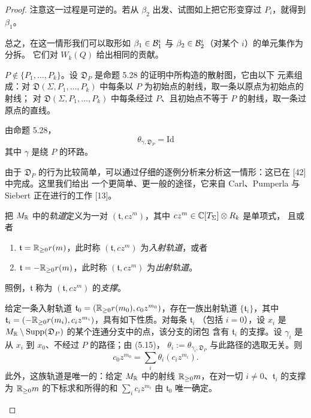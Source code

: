 \begin{proof}
注意这一过程是可逆的。若从 $\beta_2$ 出发、试图如上把它形变穿过 $P_i$，就得到 $\beta_1$。

总之，在这一情形我们可以取形如 $\beta_1\in\mathcal{B}^i_1$ 与 $\beta_2\in\mathcal{B}^i_2$（对某个 $i$）的单元集作为分拆。
它们对 $W_k(Q)$ 给出相同的贡献。

$P\notin\{P_1,\dots,P_k\}$。设 $\mathfrak D_P$ 是命题 5.28 的证明中所构造的散射图，它由以下
元素组成：对 $\mathfrak D(\Sigma,P_1,\dots,P_k)$ 中每条以 $P$ 为初始点的射线，取一条以原点为初始点的射线；
对 $\mathfrak D(\Sigma,P_1,\dots,P_k)$ 中每条经过 $P$、且初始点不等于 $P$ 的射线，取一条过原点的直线。

由命题 5.28，
\begin{equation}
\theta_{\gamma,\mathfrak D_P} = \mathrm{Id} \tag{5.15}
\end{equation}
其中 $\gamma$ 是绕 $P$ 的环路。

由于 $\mathfrak D_P$ 的行为比较简单，可以通过仔细的逐例分析来分析这一情形：这已在 [42] 中完成。这里我们给出
一个更简单、更一般的途径，它来自 Carl、Pumperla 与 Siebert 正在进行的工作 [13]。

把 $M_{\mathbb{R}}$ 中的\emph{轨道}定义为一对 $(\mathfrak t, cz^m)$，其中 $cz^m\in\mathbb{C}[T_\Sigma]\otimes R_k$ 是单项式，
且或者
\begin{enumerate}[label=(\arabic*),leftmargin=*]
\item $\mathfrak t = \mathbb{R}_{\ge0}r(m)$，此时称 $(\mathfrak t,cz^m)$ 为\emph{入射轨道}，或者
\item $\mathfrak t = -\mathbb{R}_{\ge0}r(m)$，此时称 $(\mathfrak t,cz^m)$ 为\emph{出射轨道}。
\end{enumerate}
照例，$\mathfrak t$ 称为 $(\mathfrak t,cz^m)$ 的\emph{支撑}。

\begin{claim}
给定一条入射轨道 $\mathfrak t_0 = (\mathbb{R}_{\ge0}r(m_0),c_0z^{m_0})$，存在一族出射轨道
$\{\mathfrak t_i\}$，其中 $\mathfrak t_i = (-\mathbb{R}_{\ge0}r(m_i),c_iz^{m_i})$，具有如下性质。对每条 $\mathfrak t_i$
（包括 $i=0$），设 $x_i$ 是 $M_{\mathbb{R}}\setminus\operatorname{Supp}(\mathfrak D_P)$ 的某个连通分支中的点，该分支的闭包
含有 $\mathfrak t_i$ 的支撑。设 $\gamma_i$ 是从 $x_i$ 到 $x_0$、不经过 $P$ 的路径；由 (5.15)，
$\theta_i := \theta_{\gamma_i,\mathfrak D_P}$ 与此路径的选取无关。则
\begin{equation}
c_0z^{m_0} = \sum_i\theta_i(c_iz^{m_i}). \tag{5.16}
\end{equation}
此外，这族轨道是唯一的：给定 $M_{\mathbb{R}}$ 中的射线 $\mathbb{R}_{\ge0}m$，在对一切 $i\ne0$、$\mathfrak t_i$ 的支撑为
$\mathbb{R}_{\ge0}m$ 的下标求和所得的和 $\sum_i c_iz^{m_i}$ 由 $\mathfrak t_0$ 唯一确定。
\end{claim}


\end{proof}
